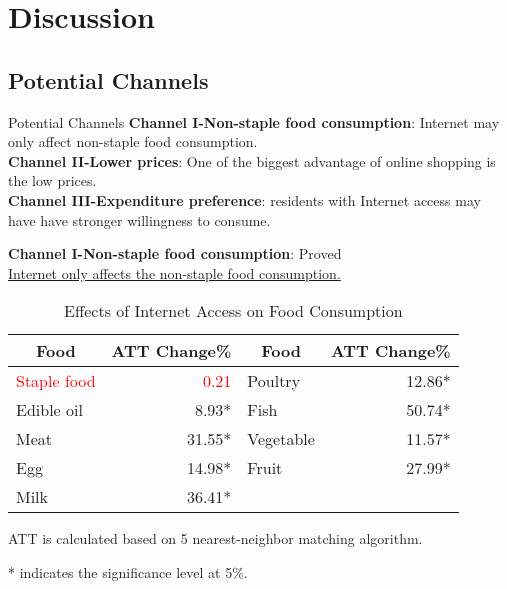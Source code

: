 \documentclass{beamer}	%
\theoremstyle{plain}
\theoremstyle{definition}
\theoremstyle{remark}
\numberwithin{equation}{section}
\begin{document}
\section{Discussion}
\subsection {Potential Channels}
\begin{frame}
	\linespread{1.2}
	\begin{block}{Potential Channels}
		\textbf{Channel I-Non-staple food consumption}: Internet may only affect non-staple food consumption. \\
		\vspace{.1cm}
		\textbf{Channel II-Lower prices}: One of the biggest advantage of online shopping is the low prices. \\
		\vspace{.1cm}
		\textbf{Channel III-Expenditure preference}: residents with Internet access may have have stronger willingness to consume. \\
	\end{block}
\end{frame}


\begin{frame}
	\textbf{Channel I-Non-staple food consumption}: Proved \\
	\underline{Internet only affects the non-staple food consumption.} \\
	\centering
	\begin{table}[]
		\caption{Effects of Internet Access on Food Consumption}
		\begin{tabular}{lrlr}
			\hline
			\multicolumn{1}{c}{Food} & \multicolumn{1}{c}{ATT Change\%} & \multicolumn{1}{c}{Food} & \multicolumn{1}{c}{ATT Change\%}  \\
			\hline
			\textcolor{red}{Staple food} & \textcolor{red}{0.21}   & Poultry   & 12.86* \\
			Edible oil  & 8.93*  & Fish      & 50.74* \\
			Meat        & 31.55* & Vegetable & 11.57* \\
			Egg         & 14.98* & Fruit     & 27.99* \\
			Milk        & 36.41* &           &        \\
			\hline
		\end{tabular}%
		\begin{tablenotes}
			\item \tiny{ATT is calculated based on 5 nearest-neighbor matching algorithm.}
			\item \tiny{* indicates the significance level at 5\%.}
		\end{tablenotes}		
	\end{table}
\end{frame}
\end{document}
